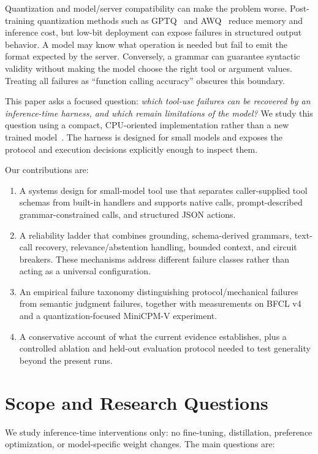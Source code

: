 \documentclass[conference]{IEEEtran}
\begin{document}
Quantization and model/server compatibility can make the problem worse. Post-training
quantization methods such as GPTQ~\cite{frantar2023gptq} and AWQ~\cite{lin2024awq} reduce
memory and inference cost, but low-bit deployment can expose failures in structured output
behavior. A model may know what operation is needed but fail to emit the format expected by
the server. Conversely, a
grammar can guarantee syntactic validity without making the model choose the right tool or
argument values. Treating all failures as “function calling accuracy” obscures this
boundary.

This paper asks a focused question:
\emph{which tool-use failures can be recovered by an inference-time harness, and which remain
limitations of the model?} We study this question using a compact, CPU-oriented implementation
rather than a new trained model~\cite{openharn2026}. The harness is designed for small models and exposes the
protocol and execution decisions explicitly enough to inspect them.

Our contributions are:
\begin{enumerate}
\item A systems design for small-model tool use that separates caller-supplied tool schemas
from built-in handlers and supports native calls, prompt-described grammar-constrained calls,
and structured JSON actions.
\item A reliability ladder that combines grounding, schema-derived grammars, text-call
recovery, relevance/abstention handling, bounded context, and circuit breakers. These
mechanisms address different failure classes rather than acting as a universal configuration.
\item An empirical failure taxonomy distinguishing protocol/mechanical failures from
semantic judgment failures, together with measurements on BFCL v4 and a quantization-focused
MiniCPM-V experiment.
\item A conservative account of what the current evidence establishes, plus a controlled
ablation and held-out evaluation protocol needed to test generality beyond the present runs.
\end{enumerate}

\section{Scope and Research Questions}

We study inference-time interventions only: no fine-tuning, distillation, preference
optimization, or model-specific weight changes. The main questions are:
\end{document}
